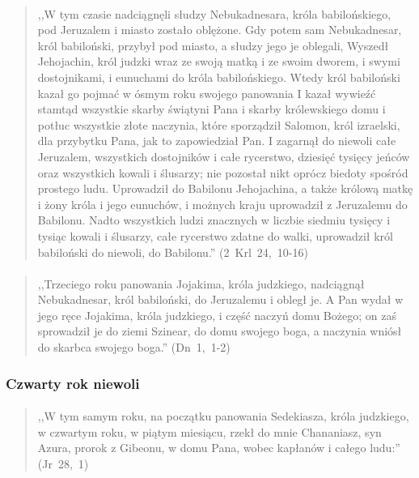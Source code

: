 \documentclass[10pt,a4paper,oneside]{article}
\begin{document}
\paragraph{}
\begin{quote}
,,W tym czasie nadciągnęli słudzy Nebukadnesara, króla babilońskiego, pod Jeruzalem i miasto zostało oblężone. Gdy potem sam Nebukadnesar, król babiloński, przybył pod miasto, a słudzy jego je oblegali, Wyszedł Jehojachin, król judzki wraz ze swoją matką i ze swoim dworem, i swymi dostojnikami, i eunuchami do króla babilońskiego. Wtedy król babiloński kazał go pojmać w ósmym roku swojego panowania I kazał wywieźć stamtąd wszystkie skarby świątyni Pana i skarby królewskiego domu i potłuc wszystkie złote naczynia, które sporządził Salomon, król izraelski, dla przybytku Pana, jak to zapowiedział Pan. I zagarnął do niewoli całe Jeruzalem, wszystkich dostojników i całe rycerstwo, dziesięć tysięcy jeńców oraz wszystkich kowali i ślusarzy; nie pozostał nikt oprócz biedoty spośród prostego ludu. Uprowadził do Babilonu Jehojachina, a także królową matkę i żony króla i jego eunuchów, i możnych kraju uprowadził z Jeruzalemu do Babilonu. Nadto wszystkich ludzi znacznych w liczbie siedmiu tysięcy i tysiąc kowali i ślusarzy, całe rycerstwo zdatne do walki, uprowadził król babiloński do niewoli, do Babilonu.'' \mbox{(2 Krl 24, 10-16)}
\end{quote}
\paragraph{}
\begin{quote}
,,Trzeciego roku panowania Jojakima, króla judzkiego, nadciągnął Nebukadnesar, król babiloński, do Jeruzalemu i obległ je. A Pan wydał w jego ręce Jojakima, króla judzkiego, i część naczyń domu Bożego; on zaś sprowadził je do ziemi Szinear, do domu swojego boga, a naczynia wniósł do skarbca swojego boga.'' \mbox{(Dn 1, 1-2)}
\end{quote}
\subsubsection{Czwarty rok niewoli}
\paragraph{}
\begin{quote}
,,W tym samym roku, na początku panowania Sedekiasza, króla judzkiego, w czwartym roku, w piątym miesiącu, rzekł do mnie Chananiasz, syn Azura, prorok z Gibeonu, w domu Pana, wobec kapłanów i całego ludu:'' \mbox{(Jr 28, 1)}
\end{quote}
\end{document}
